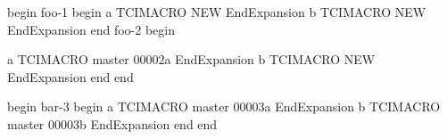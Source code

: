 begin
foo-1
begin
a
TCIMACRO
NEW
EndExpansion
b
TCIMACRO
NEW
EndExpansion
end
foo-2
begin

a
TCIMACRO
master 00002a
EndExpansion
b
TCIMACRO
NEW
EndExpansion
end
end

begin
bar-3
begin
a
TCIMACRO
master 00003a
EndExpansion
b
TCIMACRO
master 00003b
EndExpansion
end
end
